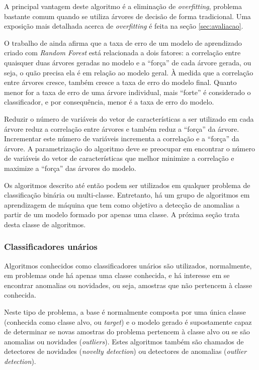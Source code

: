A principal vantagem deste algoritmo é a eliminação de \textit{overfitting}, problema bastante comum quando se utiliza árvores de decisão de forma tradicional. Uma exposição mais detalhada acerca de \textit{overfitting} é feita na seção \ref{sec:avaliacao}.

O trabalho de  ainda afirma que a taxa de erro de um modelo de aprendizado criado com \textit{Random Forest} está relacionada a dois fatores: a correlação entre quaisquer duas árvores geradas no modelo e a ``força'' de cada árvore gerada, ou seja, o quão precisa ela é em relação ao modelo geral. À medida que a correlação entre árvores cresce, também cresce a taxa de erro do modelo final. Quanto menor for a taxa de erro de uma árvore individual, mais ``forte'' é considerado o classificador, e por consequência, menor é a taxa de erro do modelo.

Reduzir o número de variáveis do vetor de características a ser utilizado em cada árvore reduz a correlação entre árvores e também reduz a ``força'' da árvore. Incrementar este número de variáveis incrementa a correlação e a ``força'' da árvore. A parametrização do algoritmo deve se preocupar em encontrar o número de variáveis do vetor de características que melhor minimize a correlação e maximize a ``força'' das árvores do modelo.

Os algoritmos descrito até então podem ser utilizados em qualquer problema de classificação binária ou multi-classe. Entretanto, há um grupo de algoritmos em aprendizagem de máquina que tem como objetivo a detecção de anomalias a partir de um modelo formado por apenas uma classe. A próxima seção trata desta classe de algoritmos.

\subsubsection*{Classificadores unários}

Algoritmos conhecidos como classificadores unários são utilizados, normalmente, em problemas onde há apenas uma classe conhecida, e há interesse em se encontrar anomalias ou novidades, ou seja, amostras que não pertencem à classe conhecida.

 Neste tipo de problema, a base é normalmente composta por uma única classe (conhecida como classe alvo, ou \textit{target}) e o modelo gerado é supostamente capaz de determinar se novas amostras do problema pertencem à classe alvo ou se são anomalias ou novidades (\textit{outliers}). Estes algoritmos também são chamados de detectores de novidades (\textit{novelty detection}) ou detectores de anomalias (\textit{outlier detection}).

